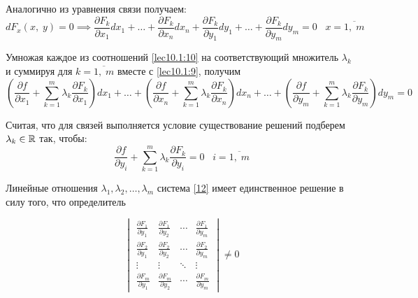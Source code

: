 \documentclass[../../main.tex]{subfiles}
\begin{document}
	Аналогично из уравнения связи получаем:
	\begin{equation}
	dF_x\left(x, \; y\right) = 0 \implies \dfrac{\partial 
	F_k}{\partial x_1}dx_1 + 
	\ldots + \dfrac{\partial F_k}{\partial x_n}dx_n + 
	\dfrac{\partial F_k}{\partial y_1}dy_1 + \ldots + 
	\dfrac{\partial F_k}{\partial y_m}dy_m = 0 \;\;\; x = \overline{1, \; m} 
	\label{lec10.1:10}
	\end{equation}
	
	Умножая каждое из соотношений \eqref{lec10.1:10} на соответствующий множитель 
	$\lambda_k$ и суммируя для $k = \overline{1,\;m}$ 
	вместе с \eqref{lec10.1:9}, получим
	\begin{equation}
	\left(\dfrac{\partial f}{\partial x_1} + \sum\limits_{k
	= 1}^m \lambda_k \dfrac{\partial F_k}{\partial x_1} 
	\right)dx_1 + \ldots + \left(\dfrac{\partial f}
	{\partial x_n} + \sum\limits_{k = 1}^m \lambda_k 
	\dfrac{\partial F_k}{\partial x_n} \right)dx_n + \ldots 
	+ \left(\dfrac{\partial f}{\partial y_m} + 
	\sum\limits_{k = 1}^m \lambda_k \dfrac{\partial F_k}
	{\partial y_m} \right)dy_m = 0 \label{lec10.1:11}
	\end{equation}
	
	Считая, что для связей выполняется условие существование 
	решений подберем $\lambda_k \in \mathbb{R}$ так, чтобы:
	\begin{equation}
	\dfrac{\partial f}{\partial y_i} + \sum\limits_{k = 1}^m \lambda_k 
	\dfrac{\partial F_k}{\partial y_i} = 0 \;\;\; i = \overline{1, \; m} 
	\label{lec10.1:12}
	\end{equation}
	
	Линейные отношения $\lambda_1, \lambda_2, \ldots, \lambda_m$ система 
	\eqref{12} имеет единственное решение в силу того, что определитель
	
	\begin{equation}
	\begin{vmatrix}
	\frac{\partial F_1}{\partial y_1} & \frac{\partial F_1}{\partial y_2}
	& \cdots & \frac{\partial F_1}{\partial y_m} \\
	\frac{\partial F_2}{\partial y_1} & \frac{\partial F_2}{\partial y_2} 
	& \cdots & \frac{\partial F_2}{\partial y_m} \\
	\vdots  & \vdots  & \ddots & \vdots  \\
	\frac{\partial F_m}{\partial y_1} & \frac{\partial F_m}{\partial y_2}
	& \cdots & \frac{\partial F_m}{\partial y_m}
	\end{vmatrix} \ne 0 
	\end{equation}
	\smallskip
	
\end{document}
